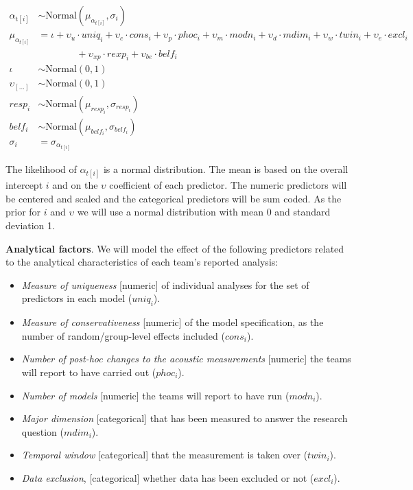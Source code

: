 \documentclass[
  english,
  man,floatsintext]{apa6}
\providecommand{\tightlist}{%
  \setlength{\itemsep}{0pt}\setlength{\parskip}{0pt}}
\begin{document}
\[
\begin{aligned}
\alpha_{\text{t}[i]}      & \sim \text{Normal}(\mu_{\alpha_{t[i]}}, \sigma_i) \\
\mu_{\alpha_{t[i]}}       & = \iota + \upsilon_u\cdot uniq_i + \upsilon_c\cdot cons_i + \upsilon_p\cdot phoc_i + \upsilon_m\cdot modn_i + \upsilon_d\cdot mdim_i + \upsilon_w\cdot twin_i + \upsilon_e\cdot excl_i \\
 & \qquad\qquad +\upsilon_{xp}\cdot rexp_i + \upsilon_{be}\cdot belf_i  \\
\iota      & \sim \text{Normal}(0, 1) \\
\upsilon_{[\ldots]} & \sim \text{Normal}(0,1) \\
resp_i & \sim \text{Normal}(\mu_{resp_i}, \sigma_{resp_i}) \\
belf_i & \sim \text{Normal}(\mu_{belf_i}, \sigma_{belf_i}) \\
\sigma_i    & = \sigma_{\alpha_{t[i]}}
\end{aligned}
\]

The likelihood of \(\alpha_{t[i]}\) is a normal distribution.
The mean is based on the overall intercept \(i\) and on the \(\upsilon\) coefficient of each predictor.
The numeric predictors will be centered and scaled and the categorical predictors will be sum coded.
As the prior for \(i\) and \(\upsilon\) we will use a normal distribution with mean 0 and standard deviation 1.

\textbf{Analytical factors}. We will model the effect of the following predictors related to the analytical characteristics of each team's reported analysis:

\begin{itemize}
\tightlist
\item
  \emph{Measure of uniqueness} {[}numeric{]} of individual analyses for the set of predictors in each model (\(uniq_i\)).
\item
  \emph{Measure of conservativeness} {[}numeric{]} of the model specification, as the number of random/group-level effects included (\(cons_i\)).
\item
  \emph{Number of post-hoc changes to the acoustic measurements} {[}numeric{]} the teams will report to have carried out (\(phoc_i\)).
\item
  \emph{Number of models} {[}numeric{]} the teams will report to have run (\(modn_i\)).
\item
  \emph{Major dimension} {[}categorical{]} that has been measured to answer the research question (\(mdim_i\)).
\item
  \emph{Temporal window} {[}categorical{]} that the measurement is taken over (\(twin_i\)).
\item
  \emph{Data exclusion}, {[}categorical{]} whether data has been excluded or not (\(excl_i\)).
\end{itemize}
\end{document}

